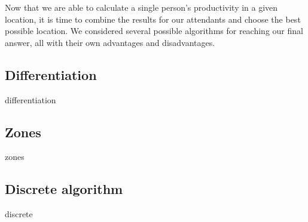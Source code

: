 
Now that we are able to calculate a single person's productivity in a given location, it is time to combine the results for our attendants and choose the best possible location. We considered several possible algorithms for reaching our final answer, all with their own advantages and disadvantages. 

\subsection{Differentiation}
{differentiation}

\subsection{Zones}
{zones}

\subsection{Discrete algorithm}
{discrete}